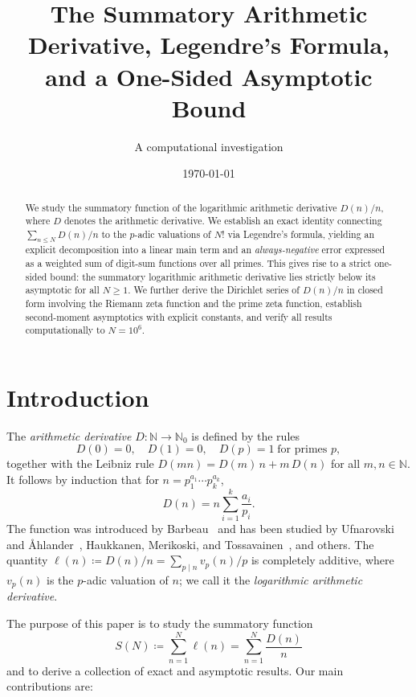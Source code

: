 \documentclass[11pt,a4paper]{amsart}
\title[Summatory Arithmetic Derivative via Legendre]{The Summatory Arithmetic Derivative, Legendre's Formula, \\and a One-Sided Asymptotic Bound}
\author{A computational investigation}
\date{\today}
\theoremstyle{plain}
\theoremstyle{definition}
\newcommand{\N}{\mathbb{N}}
\begin{document}
\begin{abstract}
We study the summatory function of the logarithmic arithmetic derivative 
$D(n)/n$, where $D$ denotes the arithmetic derivative.  We establish an 
exact identity connecting $\sum_{n \le N} D(n)/n$ to the $p$-adic valuations 
of $N!$ via Legendre's formula, yielding an explicit decomposition into a 
linear main term and an \emph{always-negative} error expressed as a weighted 
sum of digit-sum functions over all primes.  This gives rise to a strict 
one-sided bound: the summatory logarithmic arithmetic derivative lies 
strictly below its asymptotic for all $N \ge 1$.  We further derive the 
Dirichlet series of $D(n)/n$ in closed form involving the Riemann zeta 
function and the prime zeta function, establish second-moment asymptotics 
with explicit constants, and verify all results computationally to 
$N = 10^6$.
\end{abstract}

\maketitle

\section{Introduction}

The \emph{arithmetic derivative} $D \colon \N \to \N_0$ is defined by the rules
\begin{equation}\label{eq:Ddef}
D(0) = 0, \quad D(1) = 0, \quad D(p) = 1 \;\text{for primes } p,
\end{equation}
together with the Leibniz rule $D(mn) = D(m)\,n + m\,D(n)$ for all $m, n \in \N$.
It follows by induction that for $n = p_1^{a_1} \cdots p_k^{a_k}$,
\begin{equation}\label{eq:Dexplicit}
D(n) = n \sum_{i=1}^{k} \frac{a_i}{p_i}.
\end{equation}
The function was introduced by Barbeau~\cite{barbeau} and has been studied 
by Ufnarovski and {\AA}hlander~\cite{UA}, Haukkanen, Merikoski, and 
Tossavainen~\cite{HMT}, and others.  The quantity 
$\ell(n) \coloneqq D(n)/n = \sum_{p \mid n} v_p(n)/p$
is completely additive, where $v_p(n)$ is the $p$-adic valuation of $n$; 
we call it the \emph{logarithmic arithmetic derivative}.

The purpose of this paper is to study the summatory function
\[
S(N) \coloneqq \sum_{n=1}^{N} \ell(n) = \sum_{n=1}^{N} \frac{D(n)}{n}
\]
and to derive a collection of exact and asymptotic results.
Our main contributions are:
\end{document}
